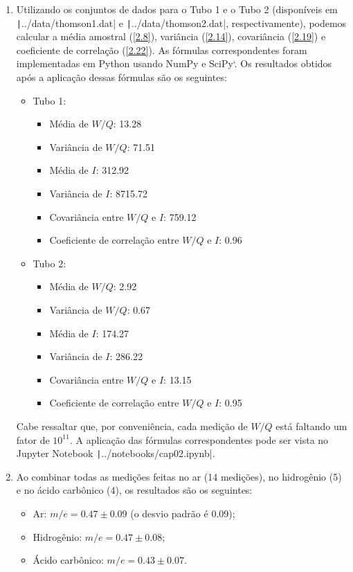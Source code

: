 \begin{enumerate}[label=\textbf{2.\arabic*.}]
	\item Utilizando os conjuntos de dados para o Tubo 1 e o Tubo 2 (disponíveis em \texttt|../data/thomson1.dat| e \texttt|../data/thomson2.dat|, respectivamente), podemos calcular a média amostral (\autoref{2.8}), variância (\autoref{2.14}), covariância (\autoref{2.19}) e coeficiente de correlação (\autoref{2.22}). As fórmulas correspondentes foram implementadas em Python usando NumPy e SciPy`. Os resultados obtidos após a aplicação dessas fórmulas são os seguintes:
	
	\begin{itemize}
		\item Tubo 1:
		\begin{itemize}
			\item Média de $W/Q$: 13.28
			\item Variância de $W/Q$: 71.51
			\item Média de $I$: 312.92
			\item Variância de $I$: 8715.72
			\item Covariância entre $W/Q$ e $I$: 759.12
			\item Coeficiente de correlação entre $W/Q$ e $I$: 0.96
		\end{itemize}
		
		\item Tubo 2:
		\begin{itemize}
			\item Média de $W/Q$: 2.92
			\item Variância de $W/Q$: 0.67
			\item Média de $I$: 174.27
			\item Variância de $I$: 286.22
			\item Covariância entre $W/Q$ e $I$: 13.15
			\item Coeficiente de correlação entre $W/Q$ e $I$: 0.95
		\end{itemize}
	\end{itemize}
	
	Cabe ressaltar que, por conveniência, cada medição de $W/Q$ está faltando um fator de $10^{11}$. A aplicação das fórmulas correspondentes pode ser vista no Jupyter Notebook \texttt|../notebooks/cap02.ipynb|.
	
	\item Ao combinar todas as medições feitas no ar (14 medições), no hidrogênio (5) e no ácido carbônico (4), os resultados são os seguintes:
	
	\begin{itemize}
	\item Ar: $m/e = 0.47 \pm 0.09$ (o desvio padrão é 0.09);		
	\item Hidrogênio: $m/e = 0.47 \pm 0.08$;
	\item Ácido carbônico: $m/e = 0.43 \pm 0.07$.
	\end{itemize}	
	

\end{enumerate}
